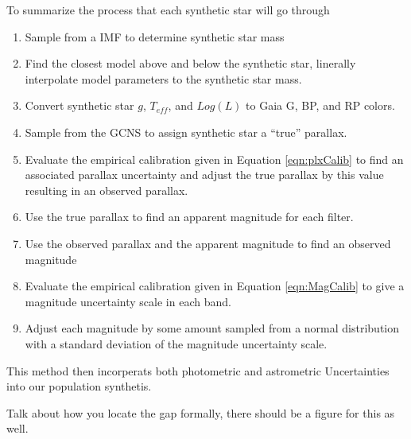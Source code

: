 To summarize the process that each synthetic star will go through
\begin{enumerate}
	\item Sample from a \citet{Sollima2019} IMF to determine synthetic star mass
	\item Find the closest model above and below the synthetic star, linerally
		interpolate model parameters to the synthetic star mass.
	\item Convert synthetic star $g$, $T_{eff}$, and $Log(L)$ to Gaia G, BP,
		and RP colors.
	\item Sample from the GCNS to assign synthetic star a ``true'' parallax.
	\item Evaluate the empirical calibration given in Equation
		\ref{eqn:plxCalib} to find an associated parallax uncertainty and
		adjust the true parallax by this value resulting in an observed
		parallax.
	\item Use the true parallax to find an apparent magnitude for each filter.
	\item Use the observed parallax and the apparent magnitude to find an
		observed magnitude
	\item Evaluate the empirical calibration given in Equation
		\ref{eqn:MagCalib} to give a magnitude uncertainty scale in each band.
	\item Adjust each magnitude by some amount sampled from a normal
		distribution with a standard deviation of the magnitude uncertainty
		scale.
\end{enumerate}

This method then incorperats both photometric and astrometric Uncertainties into
our population synthetis.


{\color{red} Talk about how you locate the gap formally, there should be a
figure for this as well.}

